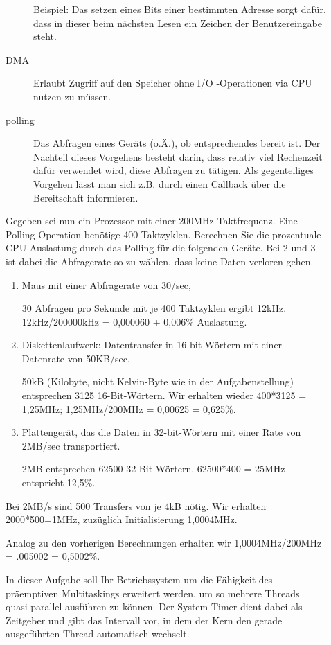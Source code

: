 \begin{description}
\begin{description}
        Beispiel: Das setzen eines Bits einer bestimmten Adresse sorgt dafür, dass in dieser beim nächsten Lesen ein Zeichen der Benutzereingabe steht.
      \item[DMA]
        Erlaubt Zugriff auf den Speicher ohne I/O -Operationen via CPU nutzen zu müssen.
      \item[polling] Das Abfragen eines Geräts (o.Ä.), ob entsprechendes bereit ist.
        Der Nachteil dieses Vorgehens besteht darin, dass relativ viel Rechenzeit dafür verwendet wird, diese Abfragen zu tätigen. Als gegenteiliges Vorgehen lässt man sich z.B. durch einen Callback über die Bereitschaft informieren.
    \end{description}

Gegeben sei nun ein Prozessor mit einer 200MHz Taktfrequenz. Eine Polling-Operation 
benötige 400 Taktzyklen. Berechnen Sie die prozentuale CPU-Auslastung durch das Polling für die folgenden Geräte. Bei 2 und 3 ist dabei die Abfragerate so zu wählen, dass keine Daten verloren gehen. 
    \begin{enumerate}[label=\arabic*.]
      \item Maus mit einer Abfragerate von 30/sec, 

        30 Abfragen pro Sekunde mit je 400 Taktzyklen ergibt 12kHz. 12kHz/200000kHz = 0,000060 + 0,006\% Auslastung.
      \item Diskettenlaufwerk: Datentransfer in 16-bit-Wörtern mit einer Datenrate von 50KB/sec, 

        50kB (Kilobyte, nicht Kelvin-Byte wie in der Aufgabenstellung) entsprechen 3125 16-Bit-Wörtern. Wir erhalten wieder 400*3125 = 1,25MHz; 1,25MHz/200MHz = 0,00625 = 0,625\%.
      \item Plattengerät, das die Daten in 32-bit-Wörtern mit einer Rate von 2MB/sec transportiert. 

        2MB entsprechen 62500 32-Bit-Wörtern. 62500*400 = 25MHz entspricht 12,5\%.
    \end{enumerate}

    Bei 2MB/s sind 500 Transfers von je 4kB nötig.
    Wir erhalten 2000*500=1MHz, zuzüglich Initialisierung 1,0004MHz.

    Analog zu den vorherigen Berechnungen erhalten wir 1,0004MHz/200MHz = .005002 = 0,5002\%.


In  dieser  Aufgabe  soll  Ihr  Betriebssystem  um  die  Fähigkeit  des  präemptiven  Multitaskings erweitert  werden,  um  so  mehrere  Threads  quasi-parallel  ausführen  zu  können.  Der  System-Timer dient  dabei  als  Zeitgeber  und  gibt  das  Intervall  vor,  in  dem  der  Kern  den  gerade ausgeführten Thread automatisch wechselt. 


\end{description}
